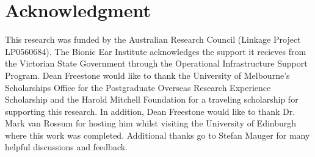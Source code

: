 \documentclass[journal,11pt,a4paper,onecolumn,draftcls]{IEEEtran}
\begin{document}
\section*{Acknowledgment}
This research was funded by the Australian Research Council (Linkage Project LP0560684). The Bionic Ear Institute acknowledges the support it recieves from the Victorian State Government through the Operational Infrastructure Support Program. Dean Freestone would like to thank the University of Melbourne's Scholarships Office for the Postgraduate Overseas Research Experience Scholarship and the Harold Mitchell Foundation for a traveling scholarship for supporting this research. In addition, Dean Freestone would like to thank Dr. Mark van Rossum for hosting him whilst visiting the University of Edinburgh where this work was completed. Additional thanks go to Stefan Mauger for many helpful discussions and feedback.









%

% 
% 
% 
% 
% 
% 

\end{document}
